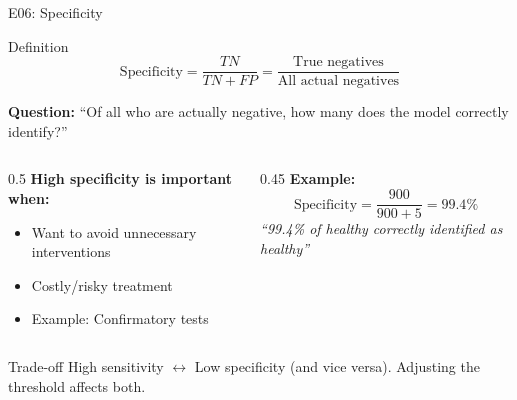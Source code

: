 \documentclass[aspectratio=169, 10pt]{beamer}
\begin{document}
\begin{frame}{E06: Specificity}
    
    \begin{block}{Definition}
        \[
        \text{Specificity} = \frac{TN}{TN + FP} = \frac{\text{True negatives}}{\text{All actual negatives}}
        \]
    \end{block}
    
    \vspace{3mm}
    
    \textbf{Question:} ``Of all who are actually negative, how many does the model correctly identify?''
    
    \vspace{3mm}
    
    \begin{columns}
        \begin{column}{0.5\textwidth}
            \textbf{High specificity is important when:}
            \begin{itemize}
                \item Want to avoid unnecessary interventions
                \item Costly/risky treatment
                \item Example: Confirmatory tests
            \end{itemize}
        \end{column}
        
        \begin{column}{0.45\textwidth}
            \textbf{Example:}
            \[
            \text{Specificity} = \frac{900}{900 + 5} = 99.4\%
            \]
            \textit{``99.4\% of healthy correctly identified as healthy''}
        \end{column}
    \end{columns}
    
    \vspace{2mm}

    \begin{alertblock}{\footnotesize Trade-off}
        \footnotesize High sensitivity $\leftrightarrow$ Low specificity (and vice versa). Adjusting the threshold affects both.
    \end{alertblock}

\end{frame}

\end{document}
